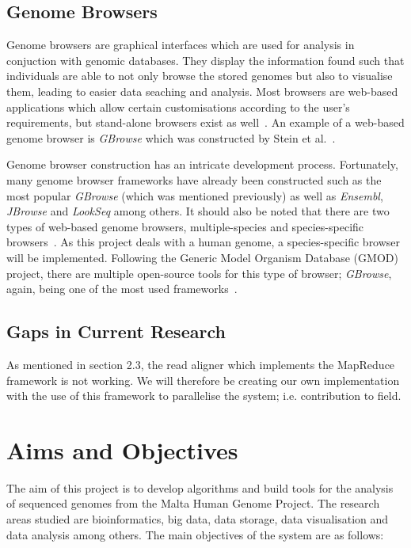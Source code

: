 \documentclass{csfyp}
\begin{document}
\subsection{Genome Browsers}\vspace{-2ex}
Genome browsers are graphical interfaces which are used for analysis in conjuction with genomic databases.  They display the information found such that individuals are able to not only browse the stored genomes but also to visualise them, leading to easier data seaching and analysis.  Most browsers are web-based applications which allow certain customisations according to the user's requirements, but stand-alone browsers exist as well~\cite{webbrowser, genericbrowser}.  An example of a web-based genome browser is {\textit{GBrowse}} which was constructed by Stein et al.~\cite{genericbrowser}. 
 
Genome browser construction has an intricate development process.  Fortunately, many genome browser frameworks have already been constructed such as the most popular {\textit{GBrowse}} (which was mentioned previously) as well as {\textit{Ensembl}}, {\textit{JBrowse}} and {\textit{LookSeq}} among others.  It should also be noted that there are two types of web-based genome browsers, multiple-species and species-specific browsers~\cite{webbrowser}.  As this project deals with a human genome, a species-specific browser will be implemented.  Following the Generic Model Organism Database (GMOD) project, there are multiple open-source tools for this type of browser; {\textit{GBrowse}}, again, being one of the most used frameworks~\cite{webbrowser}.              

\subsection{Gaps in Current Research}\vspace{-2ex}
As mentioned in section 2.3, the read aligner which implements the MapReduce framework is not working.  We will therefore be creating our own implementation with the use of this framework to parallelise the system; i.e. contribution to field.     
     

\section{Aims and Objectives}\vspace{-2ex}

The aim of this project is to develop algorithms and build tools for the analysis of sequenced genomes from the Malta Human Genome Project.  The research areas studied are bioinformatics, big data, data storage, data visualisation and data analysis among others.  The main objectives of the system are as follows:
\end{document}
